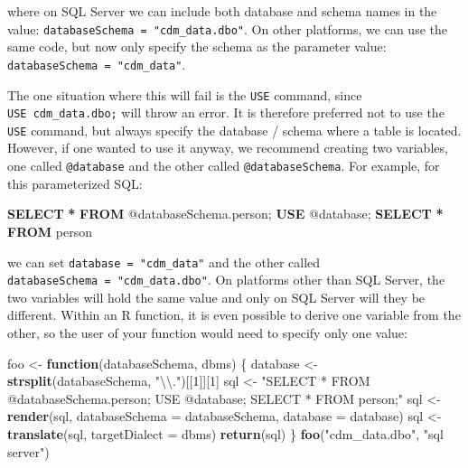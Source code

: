 \documentclass[
]{article}
\newenvironment{Shaded}{\begin{snugshade}}{\end{snugshade}}
\newcommand{\CharTok}[1]{\textcolor[rgb]{0.31,0.60,0.02}{#1}}
\newcommand{\ControlFlowTok}[1]{\textcolor[rgb]{0.13,0.29,0.53}{\textbf{#1}}}
\newcommand{\DataTypeTok}[1]{\textcolor[rgb]{0.13,0.29,0.53}{#1}}
\newcommand{\DecValTok}[1]{\textcolor[rgb]{0.00,0.00,0.81}{#1}}
\newcommand{\KeywordTok}[1]{\textcolor[rgb]{0.13,0.29,0.53}{\textbf{#1}}}
\newcommand{\NormalTok}[1]{#1}
\newcommand{\OperatorTok}[1]{\textcolor[rgb]{0.81,0.36,0.00}{\textbf{#1}}}
\newcommand{\StringTok}[1]{\textcolor[rgb]{0.31,0.60,0.02}{#1}}
\begin{document}
where on SQL Server we can include both database and schema names in the
value: \texttt{databaseSchema\ =\ "cdm\_data.dbo"}. On other platforms,
we can use the same code, but now only specify the schema as the
parameter value: \texttt{databaseSchema\ =\ "cdm\_data"}.

The one situation where this will fail is the \texttt{USE} command,
since \texttt{USE\ cdm\_data.dbo;} will throw an error. It is therefore
preferred not to use the \texttt{USE} command, but always specify the
database / schema where a table is located. However, if one wanted to
use it anyway, we recommend creating two variables, one called
\texttt{@database} and the other called \texttt{@databaseSchema}. For
example, for this parameterized SQL:

\begin{Shaded}
\begin{Highlighting}[]
\KeywordTok{SELECT} \OperatorTok{*} \KeywordTok{FROM}\NormalTok{ @databaseSchema.person;}
\KeywordTok{USE}\NormalTok{ @database;}
\KeywordTok{SELECT} \OperatorTok{*} \KeywordTok{FROM}\NormalTok{ person}
\end{Highlighting}
\end{Shaded}

we can set \texttt{database\ =\ "cdm\_data"} and the other called
\texttt{databaseSchema\ =\ "cdm\_data.dbo"}. On platforms other than SQL
Server, the two variables will hold the same value and only on SQL
Server will they be different. Within an R function, it is even possible
to derive one variable from the other, so the user of your function
would need to specify only one value:

\begin{Shaded}
\begin{Highlighting}[]
\NormalTok{foo <-}\StringTok{ }\ControlFlowTok{function}\NormalTok{(databaseSchema, dbms) \{}
\NormalTok{    database <-}\StringTok{ }\KeywordTok{strsplit}\NormalTok{(databaseSchema, }\StringTok{"}\CharTok{\textbackslash{}\textbackslash{}}\StringTok{."}\NormalTok{)[[}\DecValTok{1}\NormalTok{]][}\DecValTok{1}\NormalTok{]}
\NormalTok{    sql <-}\StringTok{ "SELECT * FROM @databaseSchema.person; USE @database; SELECT * FROM person;"}
\NormalTok{    sql <-}\StringTok{ }\KeywordTok{render}\NormalTok{(sql, }\DataTypeTok{databaseSchema =}\NormalTok{ databaseSchema, }\DataTypeTok{database =}\NormalTok{ database)}
\NormalTok{    sql <-}\StringTok{ }\KeywordTok{translate}\NormalTok{(sql, }\DataTypeTok{targetDialect =}\NormalTok{ dbms)}
    \KeywordTok{return}\NormalTok{(sql)}
\NormalTok{\}}
\KeywordTok{foo}\NormalTok{(}\StringTok{"cdm_data.dbo"}\NormalTok{, }\StringTok{"sql server"}\NormalTok{)}
\end{Highlighting}
\end{Shaded}
\end{document}
